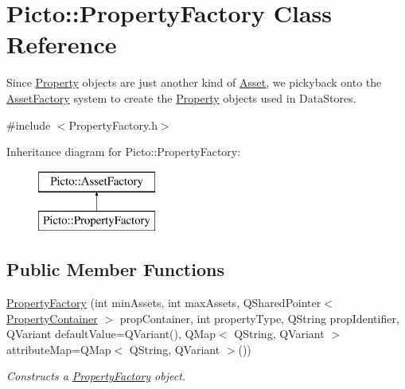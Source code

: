 \hypertarget{class_picto_1_1_property_factory}{\section{Picto\-:\-:Property\-Factory Class Reference}
\label{class_picto_1_1_property_factory}
}


Since \hyperlink{class_picto_1_1_property}{Property} objects are just another kind of \hyperlink{class_picto_1_1_asset}{Asset}, we pickyback onto the \hyperlink{class_picto_1_1_asset_factory}{Asset\-Factory} system to create the \hyperlink{class_picto_1_1_property}{Property} objects used in Data\-Stores.  




{\ttfamily \#include $<$Property\-Factory.\-h$>$}

Inheritance diagram for Picto\-:\-:Property\-Factory\-:\begin{figure}[H]
\begin{center}
\leavevmode
\includegraphics[height=2.000000cm]{class_picto_1_1_property_factory}
\end{center}
\end{figure}
\subsection*{Public Member Functions}
\begin{DoxyCompactItemize}
\item 
\hyperlink{class_picto_1_1_property_factory_a55f1c00defa265d77692d069858b480f}{Property\-Factory} (int min\-Assets, int max\-Assets, Q\-Shared\-Pointer$<$ \hyperlink{class_picto_1_1_property_container}{Property\-Container} $>$ prop\-Container, int property\-Type, Q\-String prop\-Identifier, Q\-Variant default\-Value=Q\-Variant(), Q\-Map$<$ Q\-String, Q\-Variant $>$ attribute\-Map=Q\-Map$<$ Q\-String, Q\-Variant $>$())
\begin{DoxyCompactList}\small\item\em Constructs a \hyperlink{class_picto_1_1_property_factory}{Property\-Factory} object. \end{DoxyCompactList}\end{DoxyCompactItemize}
